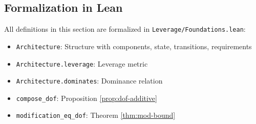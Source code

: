 \subsection{Formalization in Lean}

All definitions in this section are formalized in \texttt{Leverage/Foundations.lean}:
\begin{itemize}
\item \texttt{Architecture}: Structure with components, state, transitions, requirements
\item \texttt{Architecture.leverage}: Leverage metric
\item \texttt{Architecture.dominates}: Dominance relation
\item \texttt{compose\_dof}: Proposition \ref{prop:dof-additive}
\item \texttt{modification\_eq\_dof}: Theorem \ref{thm:mod-bound}
\end{itemize}
